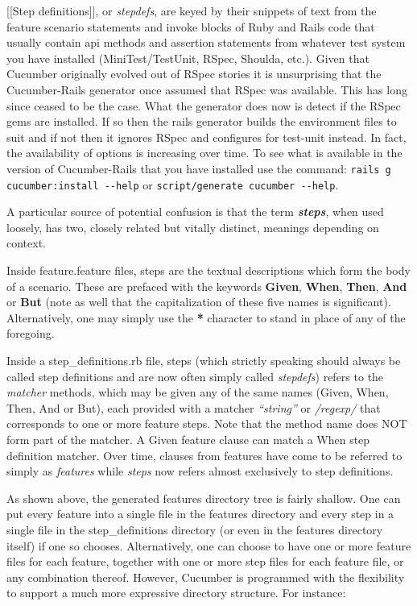 [[Step definitions]], or \emph{stepdefs}, are keyed by their snippets of text from the feature scenario statements and invoke blocks of Ruby and Rails code that usually contain api methods and assertion statements from whatever test system you have installed (MiniTest/TestUnit, RSpec, Shoulda, etc.).  Given that Cucumber originally evolved out of RSpec stories it is unsurprising that the Cucumber-Rails generator once assumed that RSpec was available.  This has long since ceased to be the case.  What the generator does now is detect if the RSpec gems are installed.  If so then the rails generator builds the environment files to suit and if not then it ignores RSpec and configures for test-unit instead.  In fact, the availability of options is increasing over time.  To see what is available in the version of Cucumber-Rails that you have installed use the command: \verb+rails g cucumber:install --help+ or \verb+script/generate cucumber --help+.

A particular source of potential confusion is that the term \emph{\textbf{steps}}, when used loosely, has two, closely related but vitally distinct, meanings depending on context.

Inside feature.feature files, steps are the textual descriptions which form the body of a scenario.  These are prefaced with the keywords \textbf{Given}, \textbf{When}, \textbf{Then}, \textbf{And} or \textbf{But} (note as well that the capitalization of these five names is significant).  Alternatively, one may simply use the \textbf{*} character to stand in place of any of the foregoing.

Inside a step\_definitions.rb file, steps (which strictly speaking should always be called step definitions and are now often simply called \emph{stepdefs}) refers to the \emph{matcher} methods, which may be given any of the same names (Given, When, Then, And or But), each provided with a matcher \emph{``string''} or \emph{/regexp/} that corresponds to one or more feature steps.  Note that the method name does NOT form part of the matcher.  A Given feature clause can match a When step definition matcher.  Over time, clauses from features have come to be referred to simply as \emph{features} while \emph{steps} now refers almost exclusively to step definitions.

As shown above, the generated features directory tree is fairly shallow.  One can put every feature into a single file in the features directory and every step in a single file in the step\_definitions directory (or even in the features directory itself) if one so chooses.  Alternatively, one can choose to have one or more feature files for each feature, together with one or more step files for each feature file, or any combination thereof.  However, Cucumber is programmed with the flexibility to support a much more expressive directory structure.  For instance:

